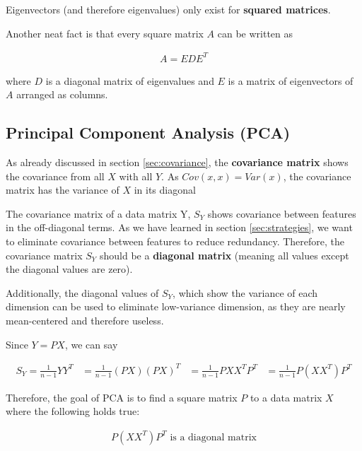 \documentclass[11pt]{article}
\begin{document}
Eigenvectors (and therefore eigenvalues) only exist for \textbf{squared matrices}.

\vspace{10px}

Another neat fact is that every square matrix $A$ can be written as

\begin{align}
    A = EDE^T
\end{align}

where $D$ is a diagonal matrix of eigenvalues and $E$ is a matrix of eigenvectors of $A$ arranged as columns.


\subsection{Principal Component Analysis (PCA)}

As already discussed in section \ref{sec:covariance}, the \textbf{covariance matrix} shows the covariance from all $X$ with all $Y$. As $Cov(x,x) = Var(x)$, the covariance matrix has the variance of $X$ in its diagonal

\vspace{10px}

The covariance matrix of a data matrix Y, $S_Y$ shows covariance between features in the off-diagonal terms. As we have learned in section \ref{sec:strategies}, we want to eliminate covariance between features to reduce redundancy. Therefore, the covariance matrix $S_Y$ should be a \textbf{diagonal matrix} (meaning all values except the diagonal values are zero).

Additionally, the diagonal values of $S_Y$, which show the variance of each dimension can be used to eliminate low-variance dimension, as they are nearly mean-centered and therefore useless.

\vspace{10px}

Since $Y = PX$, we can say

\begin{align*}
    S_Y = \frac{1}{n-1} YY^T & = \frac{1}{n-1} (PX)(PX)^T & = \frac{1}{n-1} PXX^TP^T & = \frac{1}{n-1}P(XX^T)P^T
\end{align*}

Therefore, the goal of PCA is to find a square matrix $P$ to a data matrix $X$ where the following holds true:

\begin{align}
    P(XX^T)P^T \text{  is a diagonal matrix}
\end{align}
\end{document}
